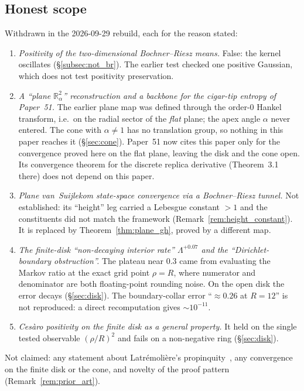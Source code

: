 \documentclass[11pt,a4paper]{article}
\theoremstyle{plain}
\theoremstyle{definition}
\newcommand{\R}{\mathbb{R}}
\begin{document}
\subsection{Honest scope}\label{subsec:withdrawn}
Withdrawn in the 2026-09-29 rebuild, each for the reason stated:
\begin{enumerate}
\item \emph{Positivity of the two-dimensional Bochner--Riesz means.}
False: the kernel oscillates (\S\ref{subsec:not_br}). The earlier test
checked one positive Gaussian, which does not test positivity
preservation.
\item \emph{A ``plane $\R^{2}_{\alpha}$'' reconstruction and a backbone for
the cigar-tip entropy of Paper~51.} The earlier plane map was defined
through the order-$0$ Hankel transform, i.e.\ on the radial sector of
the \emph{flat} plane; the apex angle $\alpha$ never entered. The cone
with $\alpha\ne1$ has no translation group, so nothing in this paper
reaches it (\S\ref{sec:cone}). Paper~51 now cites this paper only for
the convergence proved here on the flat plane, leaving the disk and the
cone open. Its convergence theorem for the discrete replica derivative
(Theorem~3.1 there) does not depend on this paper.
\item \emph{Plane van~Suijlekom state-space convergence via a
Bochner--Riesz tunnel.} Not established: its ``height'' leg carried a
Lebesgue constant $>1$ and the constituents did not match the framework
(Remark~\ref{rem:height_constant}). It is replaced by
Theorem~\ref{thm:plane_gh}, proved by a different map.
\item \emph{The finite-disk ``non-decaying interior rate''
$\Lambda^{+0.07}$ and the ``Dirichlet-boundary obstruction''.} The
plateau near $0.3$ came from evaluating the Markov ratio at the exact
grid point $\rho=R$, where numerator and denominator are both
floating-point rounding noise. On the open disk the error decays
(\S\ref{sec:disk}). The boundary-collar error ``$\approx0.26$ at $R=12$''
is not reproduced: a direct recomputation gives $\sim10^{-11}$.
\item \emph{Ces\`aro positivity on the finite disk as a general
property.} It held on the single tested observable $(\rho/R)^{2}$ and
fails on a non-negative ring (\S\ref{sec:disk}).
\end{enumerate}
Not claimed: any statement about Latr\'emoli\`ere's
propinquity~\cite{latremoliere2015,latremoliere2016,latremoliere2025},
any convergence on the finite disk or the cone, and novelty of the
proof pattern (Remark~\ref{rem:prior_art}).
\end{document}
